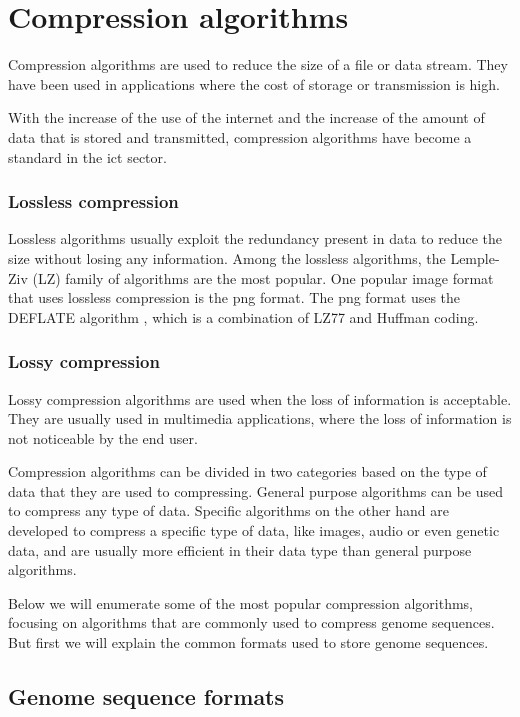 \section{Compression algorithms}

Compression algorithms are used to reduce the size of a file or data stream. They have been used in applications where the cost of storage or transmission is high.

With the increase of the use of the internet and the increase of the amount of data that is stored and transmitted, compression algorithms have become a standard in the \ac{ict} sector.

\subsubsection{Lossless compression}

Lossless algorithms usually exploit the redundancy present in data to reduce the size without losing any information. Among the lossless algorithms, the Lemple-Ziv (LZ) family of algorithms are the most popular. One popular image format that uses lossless compression is the \ac{png} format. The \ac{png} format uses the DEFLATE algorithm \cite{rfc1951}, which is a combination of LZ77 and Huffman coding.

\subsubsection{Lossy compression}

Lossy compression algorithms are used when the loss of information is acceptable. They are usually used in multimedia applications, where the loss of information is not noticeable by the end user.

Compression algorithms can be divided in two categories based on the type of data that they are used to compressing. General purpose algorithms can be used to compress any type of data. Specific algorithms on the other hand are developed to compress a specific type of data, like images, audio or even genetic data, and are usually more efficient in their data type than general purpose algorithms.

Below we will enumerate some of the most popular compression algorithms, focusing on algorithms that are commonly used to compress genome sequences. But first we will explain the common formats used to store genome sequences.

\subsection{Genome sequence formats}

